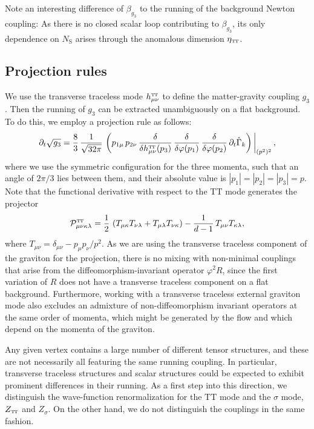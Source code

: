 \documentclass[11pt]{book}
\newcommand\TTspace{ -1pt }
\newcommand\TT{ \scriptscriptstyle{\mathrm{T\hspace{\TTspace}T}} }
\newcommand\hTTmunu{ h^{\scriptscriptstyle{\mathrm{T\hspace{\TTspace}T}}}_{\mu\nu} }
\newcommand\etaTT{ \eta_{\scriptscriptstyle{\mathrm{T\hspace{\TTspace}T}}} }
\newcommand\ZTT{ Z_{\scriptscriptstyle{\mathrm{T\hspace{\TTspace}T}}} }
\newcommand\NS{ N_{\scriptscriptstyle{\mathrm{S}}} }
\numberwithin{equation}{chapter}
\begin{document}
Note an interesting difference of $\beta_{g_3}$ to the running of the background Newton coupling:
As there is no closed scalar loop contributing to $\beta_{g_3}$,
its only dependence on $\NS$ arises through the anomalous dimension $\etaTT$.


\subsection{Projection rules}

We use the transverse traceless mode $\hTTmunu$
to define the matter-gravity coupling $g_3$.
Then the running of $g_3$ can be extracted unambiguously on a flat background.
To do this, we employ a projection rule as follows:
\begin{align}
  \partial_t \sqrt{g_3} = \frac{8}{3} \, \frac{1}{\sqrt{32 \pi}} \,
  \left(
    p_{1\mu} \, p_{2\nu}  \,
    \frac{\delta}{\delta \hTTmunu(p_3)} \, \frac{\delta}{\delta\varphi(p_1)} \, \frac{\delta}{\delta\varphi(p_2)} \,
    \partial_t \hat \Gamma_k
  \right) \bigg|_{(p^2)^2} \,,
  \label{projectiong3}
\end{align}
where we use the symmetric configuration for the three momenta,
such that an angle of $2\pi/3$ lies between them, and their absolute value is $|p_1| = |p_2|=|p_3| =p$.
Note that the functional derivative with respect to the $\mathrm{TT}$ mode generates the projector
\begin{align}
  \mathcal{P}^{\TT}_{\mu\nu\kappa\lambda} = \frac{1}{2} \,
  \left(
    T_{\mu
    \kappa}T_{\nu \lambda}
    + T_{\mu\lambda}T_{\nu \kappa}
  \right)
  - \frac{1}{d-1} \, T_{\mu\nu}T_{\kappa\lambda},
  \label{projector}
\end{align}
where $T_{\mu \nu}=\delta_{\mu\nu}-p_{\mu}p_{\nu}/p^2$.
As we are using the transverse traceless component of the graviton for the projection,
there is no mixing with non-minimal couplings that arise from the diffeomorphism-invariant
operator $\varphi^2 R$, since the first variation of $R$ does not have a transverse traceless
component  on a flat background.
Furthermore, working with a transverse traceless external graviton mode also excludes an admixture
of non-diffeomorphism invariant operators at the same order of momenta,
which might be generated by the flow and which depend on the momenta of the graviton.

Any given vertex contains a large number of different tensor structures,
and these are not necessarily all featuring the same running coupling.
In particular, transverse traceless structures and scalar structures could be expected to exhibit
prominent differences in their running. As a first step into this direction,
we distinguish the wave-function renormalization for the $\mathrm{TT}$ mode and the $\sigma$ mode,
$\ZTT$ and $Z_{\sigma}$. On the other hand, we do not distinguish the couplings in the same fashion.
\end{document}
